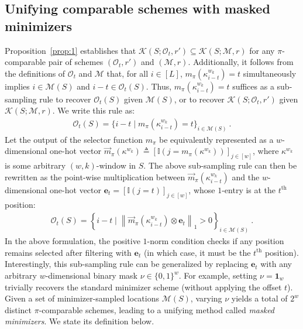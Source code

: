 \subsection{Unifying comparable schemes with masked minimizers}
\label{sec:maskedmnz}
Proposition~\ref{prop:1} establishes that $\mathcal{K}(S; \mathcal{O}_t,r') \subseteq \mathcal{K}(S; \mathcal{M},r)$ for any $\pi$-comparable pair of schemes $(\mathcal{O}_t, r')$ and $(\mathcal{M}, r)$. Additionally, it follows from the definitions of $\mathcal{O}_t$ and $\mathcal{M}$ that, for all $i \in [L]$, $m_\pi(\kappa^{w_k}_{i - t}) = t$ simultaneously implies $i \in \mathcal{M}(S)$ and $i-t \in \mathcal{O}_t(S)$. Thus, $m_\pi(\kappa^{w_k}_{i - t}) = t$ suffices as a sub-sampling rule to recover $\mathcal{O}_t(S)$ given $\mathcal{M}(S)$, or to recover $\mathcal{K}(S; \mathcal{O}_t,r')$ given $\mathcal{K}(S; \mathcal{M},r)$. We write this rule as:
\begin{eqnarray}
\mathcal{O}_t(S) = \{i - t \mid m_\pi(\kappa^{w_k}_{i-t}) = t\}_{i \in \mathcal{M}(S)} \ .
\end{eqnarray}
Let the output of the selector function $m_\pi$ be equivalently represented as a $w$-dimensional one-hot vector $\overrightarrow{m}_\pi(\kappa^{w_k}) \triangleq [\mathbb{I}(j=m_\pi(\kappa^{w_k}))]_{j\in[w]}$, where $\kappa^{w_k}$ is some arbitrary $(w,k)$-window in $S$. The above sub-sampling rule can then be rewritten as the point-wise multiplication between $\overrightarrow{m}_\pi(\kappa^{w_k}_{i-t})$ and the $w$-dimensional one-hot vector $\mathbf{e}_t=[\mathbb{I}(j=t)]_{j\in[w]}$, whose $1$-entry is at the $t^{\text{th}}$ position:
\begin{eqnarray}
\mathcal{O}_t(S) = \left\{
i - t \mid \left\|    \overrightarrow{m}_\pi(\kappa^{w_k}_{i-t}) \otimes \mathbf{e}_t
\right\|_1 > 0
\right\}_{i \in \mathcal{M}(S)} \ .
\end{eqnarray}
In the above formulation, the positive $1$-norm condition checks if any position remains selected after filtering with $\mathbf{e}_t$ (in which case, it must be the $t^{\text{th}}$ position). Interestingly, this sub-sampling rule can be generalized by replacing $\mathbf{e}_t$ with any arbitrary $w$-dimensional binary mask $\nu \in \{0,1\}^w$. For example, setting $\nu=\mathbf{1}_w$ trivially recovers the standard minimizer scheme (without applying the offset $t$). Given a set of minimizer-sampled locations $\mathcal{M}(S)$,  varying $\nu$ yields a total of $2^w$ distinct $\pi$-comparable schemes, leading to a unifying method called \textit{masked minimizers}. We state its definition below.


